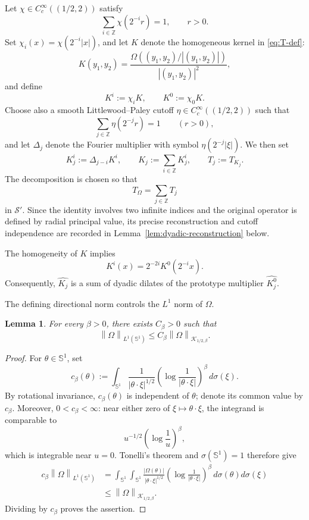 \documentclass[11pt]{amsart}
\newtheorem{lemma}[definition]{Lemma}
\theoremstyle{remark}
\numberwithin{equation}{section}
\newcommand{\Sph}{\mathbb S^1}
\newcommand{\cK}{\mathcal K}
\newcommand{\norm}[1]{\left\lVert #1\right\rVert}
\newcommand{\abs}[1]{\left\lvert #1\right\rvert}
\begin{document}
	Let \(\chi\in C_c^\infty((1/2,2))\) satisfy
	\[
	\sum_{i\in\mathbb Z}\chi(2^{-i}r)=1,\qquad r>0.
	\]
	Set \(\chi_i(x)=\chi(2^{-i}|x|)\), and let \(K\) denote the homogeneous kernel
	in \eqref{eq:T-def}:
	\[
	K(y_1,y_2)=\frac{\Omega((y_1,y_2)/\abs{(y_1,y_2)})}{\abs{(y_1,y_2)}^2},
	\]
	and define
	\[
	K^i:=\chi_iK,
	\qquad
	K^0:=\chi_0K.
	\]
	Choose also a smooth Littlewood--Paley cutoff
	\(\eta\in C_c^\infty((1/2,2))\) such that
	\[
	\sum_{j\in\mathbb Z}\eta(2^{-j}r)=1
	\qquad (r>0),
	\]
	and let \(\Delta_j\) denote the Fourier multiplier with symbol
	\(\eta(2^{-j}\abs{\xi})\).  We then set
	\[
	K_j^i:=\Delta_{j-i}K^i,
	\qquad
	K_j:=\sum_{i\in\mathbb Z}K_j^i,
	\qquad
	T_j:=T_{K_j}.
	\]
	The decomposition is chosen so that
	\[
	T_\Omega=\sum_{j\in\mathbb Z}T_j
	\]
	in \(\mathcal S'\). Since the identity involves two infinite indices and
	the original operator is defined by radial principal value, its precise
	reconstruction and cutoff independence are recorded in
	Lemma~\ref{lem:dyadic-reconstruction} below.
	
	The homogeneity of \(K\) implies
	\[
	K^i(x)=2^{-2i}K^0(2^{-i}x).
	\]
	Consequently, \(\widehat{K_j}\) is a sum of dyadic dilates of the prototype multiplier \(\widehat{K_j^0}\).
	
	The defining directional norm controls the \(L^1\) norm of \(\Omega\).
	
	\begin{lemma}\label{lem:L1-from-K}
		For every \(\beta>0\), there exists \(C_\beta>0\) such that
		\[
		\norm{\Omega}_{L^1(\Sph)}\le C_\beta\norm{\Omega}_{\cK_{1/2,\beta}}.
		\]
	\end{lemma}
	
	\begin{proof}
		For \(\theta\in\Sph\), set
		\[
		c_\beta(\theta):=
		\int_{\Sph}
		\frac{1}{\abs{\theta\cdot\xi}^{1/2}}
		\left(\log\frac1{\abs{\theta\cdot\xi}}\right)^\beta
		\,d\sigma(\xi).
		\]
		By rotational invariance, \(c_\beta(\theta)\) is independent of \(\theta\);
		denote its common value by \(c_\beta\).  Moreover, \(0<c_\beta<\infty\): near
		either zero of \(\xi\mapsto\theta\cdot\xi\), the integrand is comparable to
		\[
		u^{-1/2}\left(\log\frac1u\right)^\beta,
		\]
		which is integrable near \(u=0\).  Tonelli's theorem and
		\(\sigma(\Sph)=1\) therefore give
		\begin{align*}
			c_\beta\norm{\Omega}_{L^1(\Sph)}
			&=
			\int_{\Sph}\int_{\Sph}
			\frac{\abs{\Omega(\theta)}}{\abs{\theta\cdot\xi}^{1/2}}
			\left(\log\frac1{\abs{\theta\cdot\xi}}\right)^\beta
			\,d\sigma(\theta)d\sigma(\xi)\\
			&\le
			\norm{\Omega}_{\cK_{1/2,\beta}}.
		\end{align*}
		Dividing by \(c_\beta\) proves the assertion.
	\end{proof}
	
\end{document}
